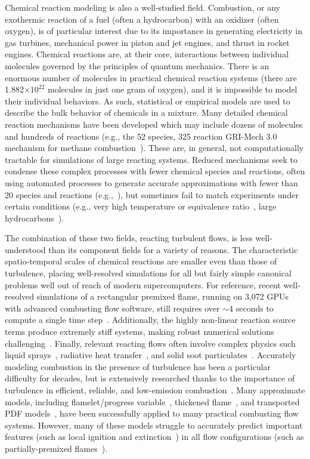 Chemical reaction modeling is also a well-studied field. Combustion, or any exothermic reaction of a fuel (often a hydrocarbon) with an oxidizer (often oxygen), is of particular interest due to its importance in generating electricity in gas turbines, mechanical power in piston and jet engines, and thrust in rocket engines. Chemical reactions are, at their core, interactions between individual molecules governed by the principles of quantum mechanics. There is an enormous number of molecules in practical chemical reaction systems (there are 1.882$\times 10^{22}$ molecules in just one gram of oxygen), and it is impossible to model their individual behaviors. As such, statistical or empirical models are used to describe the bulk behavior of chemicals in a mixture. Many detailed chemical reaction mechanisms have been developed which may include dozens of molecules and hundreds of reactions (e.g., the 52 species, 325 reaction GRI-Mech 3.0 mechanism for methane combustion~\cite{griMech}). These are, in general, not computationally tractable for simulations of large reacting systems. Reduced mechanisms seek to condense these complex processes with fewer chemical species and reactions, often using automated processes to generate accurate approximations with fewer than 20 species and reactions (e.g.,~\cite{Sung1998}), but sometimes fail to match experiments under certain conditions (e.g., very high temperature or equivalence ratio~\cite{Westbrook1984}, large hydrocarbons~\cite{Lu2008}).

The combination of these two fields, reacting turbulent flows, is less well-understood than its component fields for a variety of reasons. The characteristic spatio-temporal scales of chemical reactions are smaller even than those of turbulence, placing well-resolved simulations for all but fairly simple canonical problems well out of reach of modern supercomputers. For reference, recent well-resolved simulations of a rectangular premixed flame, running on 3,072 GPUs with advanced combusting flow software, still requires over $\sim$4 seconds to compute a single time step~\cite{HenrydeFrahan2022}. Additionally, the highly non-linear reaction source terms produce extremely stiff systems, making robust numerical solutions challenging~\cite{SuoYang2017}. Finally, relevant reacting flows often involve complex physics such liquid sprays~\cite{Masri2016}, radiative heat transfer~\cite{radCombustion}, and solid soot particulates~\cite{Omidvarborna2015}. Accurately modeling combustion in the presence of turbulence has been a particular difficulty for decades, but is extensively researched thanks to the importance of turbulence in efficient, reliable, and low-emission combustion~\cite{peters2000}. Many approximate models, including flamelet/progress variable~\cite{Pierce2001}, thickened flame~\cite{Colin2000}, and transported PDF models~\cite{Pope1985}, have been successfully applied to many practical combusting flow systems. However, many of these models struggle to accurately predict important features (such as local ignition and extinction~\cite{Jones2007}) in all flow configurations (such as partially-premixed flames~\cite{Knudsen2015}).

